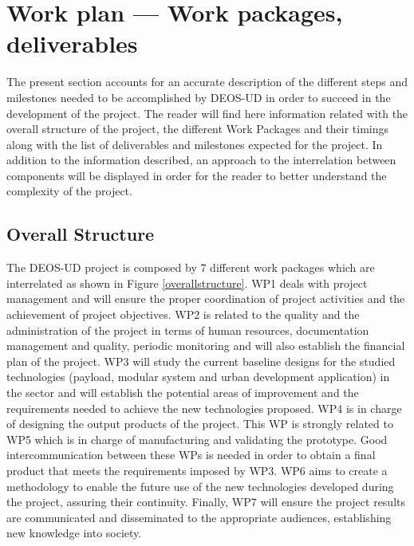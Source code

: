 \section{Work plan — Work packages, deliverables}

The present section accounts for an accurate description of the different steps and milestones needed to be accomplished by DEOS-UD in order to succeed in the development of the project. The reader will find here information related with the overall structure of the project, the different Work Packages and their timings along with the list of deliverables and milestones expected for the project. In addition to the information described, an approach to the interrelation between components will be displayed in order for the reader to better understand the complexity of the project.  

\subsection{Overall Structure}

The DEOS-UD project is composed by 7 different work packages which are interrelated as shown in Figure \ref{overallstructure}. WP1 deals with project management and will ensure the proper coordination of project activities and the achievement of project objectives. WP2 is related to the quality and the administration of the project in terms of human resources, documentation management and quality, periodic monitoring and will also establish the financial plan of the project. WP3 will study the current baseline designs for the studied technologies (payload, modular system and urban development application) in the sector and will establish the potential areas of improvement and the requirements needed to achieve the new technologies proposed. WP4 is in charge of designing the output products of the project. This WP is strongly related to WP5 which is in charge of manufacturing and validating the prototype. Good intercommunication between these WPs is needed in order to obtain a final product that meets the requirements imposed by WP3. WP6 aims to create a methodology to enable the future use of the new technologies developed during the project, assuring their continuity. Finally, WP7 will ensure the project results are communicated and disseminated to the appropriate audiences, establishing new knowledge into society. 

